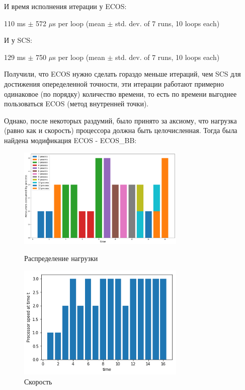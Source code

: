 \documentclass{article}
\begin{document}
И время исполнения итерации у ECOS: 

110 ms $\pm$ 572 $\mu$s per loop (mean $\pm$ std. dev. of 7 runs, 10 loops each)

И у SCS:

129 ms $\pm$ 750 $\mu$s per loop (mean $\pm$ std. dev. of 7 runs, 10 loops each)

Получили, что ECOS нужно сделать гораздо меньше итераций, чем SCS для достижения опеределенной точности, эти итерации работают примерно одинаковое (по порядку) количество времени, то есть по времени выгоднее пользоваться ECOS (метод внутренней точки).

Однако, после некоторых раздумий, было принято за аксиому, что нагрузка (равно как и скорость) процессора должна быть целочисленная. Тогда была найдена модификация ECOS - ECOS\_BB:


\begin{figure}[h]
\begin{center}
\begin{minipage}[h]{8cm}
\includegraphics[width=8cm]{ECOSBB_2.png}
\caption{Распределение нагрузки} %
\label{ris:experimoriginal} %
\end{minipage}
\hfill 
\begin{minipage}[h]{8cm}
\includegraphics[width=8cm]{ECOSBB_3.png}
\caption{Скорость}
\label{ris:experimcoded}
\end{minipage}
\end{center}
\end{figure}
\end{document}
